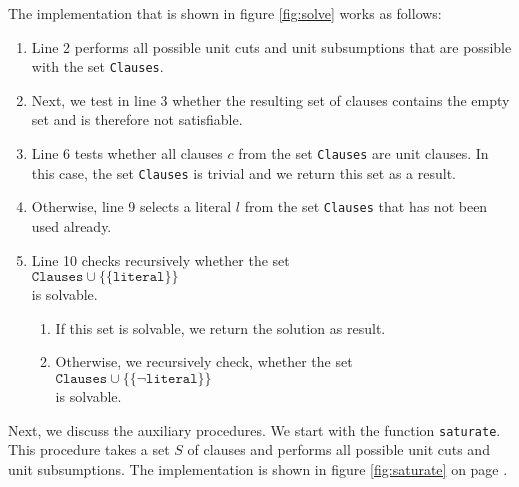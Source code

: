 The implementation that is shown in figure \ref{fig:solve} works as follows:
\begin{enumerate}
\item Line 2 performs all possible unit cuts and unit subsumptions that are possible
      with the set  \texttt{Clauses}.
\item Next, we test in line 3 whether the resulting set of clauses contains the empty set 
      and is therefore not satisfiable.
\item Line 6 tests whether all clauses $c$ from the set
      \texttt{Clauses} are unit clauses.  In this case, the set \texttt{Clauses} is 
      trivial and we return this set as a result.
\item Otherwise, line 9 selects a literal $l$ from the set \texttt{Clauses}
      that has not been used already.
\item Line 10 checks recursively whether the set \\[0.2cm]
      \hspace*{1.3cm} 
      $\mathtt{Clauses} \cup \bigl\{\{\mathtt{literal}\}\bigr\}$ 
      \\[0.2cm]
      is solvable.
      \begin{enumerate}
      \item If this set is solvable, we return the solution as result.
      \item Otherwise, we recursively check, whether the set \\[0.2cm]
            \hspace*{1.3cm} $\mathtt{Clauses} \cup \bigl\{ \{ \neg \mathtt{literal}\} \bigr\}$ \\[0.2cm]
            is solvable.  
      \end{enumerate}
\end{enumerate}

Next, we discuss the auxiliary procedures. We start with the  function
\texttt{saturate}. 
This procedure takes a set $S$ of clauses and performs all possible unit cuts and unit
subsumptions.  The implementation is shown in figure \ref{fig:saturate} on page \pageref{fig:saturate}.

